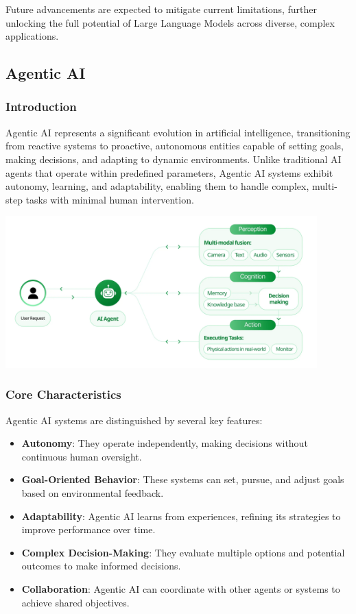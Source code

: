 Future advancements are expected to mitigate current limitations, further unlocking the full potential of Large Language Models across diverse, complex applications.

\subsection{Agentic AI}

\subsubsection{Introduction}
Agentic AI represents a significant evolution in artificial intelligence, transitioning from reactive systems to proactive, autonomous entities capable of setting goals, making decisions, and adapting to dynamic environments. Unlike traditional AI agents that operate within predefined parameters, Agentic AI systems exhibit autonomy, learning, and adaptability, enabling them to handle complex, multi-step tasks with minimal human intervention.

\begin{center}
    \centering
    \includegraphics[width=0.9\textwidth]{Images/agentic_ai_architecture.png}
     \cite{agenticAIArchitecture}
    \label{fig:agentic_ai_architecture}
\end{center}

\subsubsection{Core Characteristics}
Agentic AI systems are distinguished by several key features:

\begin{itemize}
    \item \textbf{Autonomy}: They operate independently, making decisions without continuous human oversight.
    \item \textbf{Goal-Oriented Behavior}: These systems can set, pursue, and adjust goals based on environmental feedback.
    \item \textbf{Adaptability}: Agentic AI learns from experiences, refining its strategies to improve performance over time.
    \item \textbf{Complex Decision-Making}: They evaluate multiple options and potential outcomes to make informed decisions.
    \item \textbf{Collaboration}: Agentic AI can coordinate with other agents or systems to achieve shared objectives.
\end{itemize}

